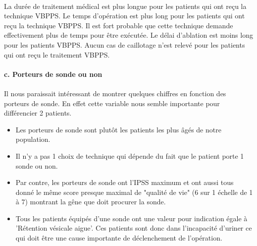 \documentclass[11pt]{article}
\providecommand{\tightlist}{%
      \setlength{\itemsep}{0pt}\setlength{\parskip}{0pt}}
\begin{document}
    
    \begin{center}
    \end{center}
    
    
    \begin{center}
    \end{center}
    
    
    \begin{center}
    \end{center}
    
\paragraph{}
    La durée de traitement médical est plus longue pour les patients qui ont
reçu la technique VBPPS. Le temps d'opération est plus long pour les
patients qui ont reçu la technique VBPPS. Il est fort probable que cette
technique demande effectivement plus de temps pour être exécutée. Le
délai d'ablation est moins long pour les patients VBPPS. Aucun cas de
caillotage n'est relevé pour les patients qui ont reçu le traitement
VBPPS.

    \paragraph{c. Porteurs de sonde ou non}\label{c.-porteurs-de-sonde-ou-non}

\paragraph{}
Il nous paraissait intéressant de montrer quelques chiffres en fonction
des porteurs de sonde. En effet cette variable nous semble importante
pour différencier 2 patients.

\begin{itemize}
\tightlist
\item Les porteurs de sonde sont plutôt les patients les plus âgés de notre
population.
\item 
Il n'y a pas 1 choix de technique qui dépende du fait que le patient
porte 1 sonde ou non.
\item 
Par contre, les porteurs de sonde ont l'IPSS maximum et ont aussi tous
donné le même score presque maximal de "qualité de vie" (6 sur 1 échelle
de 1 à 7) montrant la gêne que doit procurer la sonde.
\item 
Tous les patients équipés d'une sonde ont une valeur pour indication
égale à 'Rétention vésicale aigue'. Ces patients sont donc dans
l'incapacité d'uriner ce qui doit être une cause importante de
déclenchement de l'opération.
\end{itemize}
\end{document}
